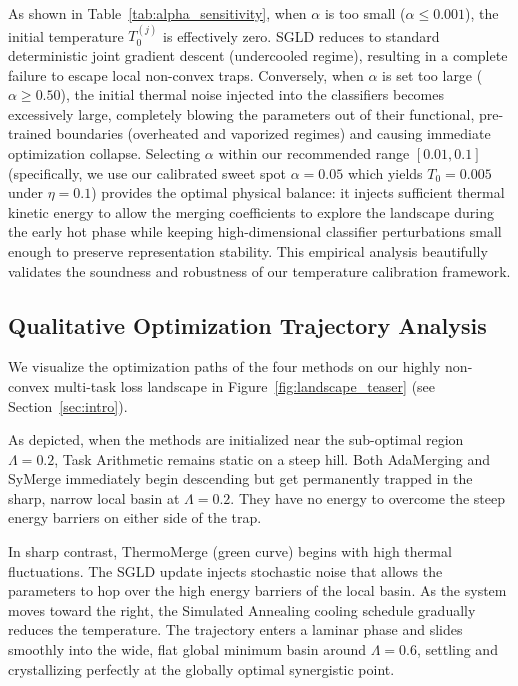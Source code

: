 As shown in Table~\ref{tab:alpha_sensitivity}, when $\alpha$ is too small ($\alpha \le 0.001$), the initial temperature $T_0^{(j)}$ is effectively zero.
SGLD reduces to standard deterministic joint gradient descent (undercooled regime), resulting in a complete failure to escape local non-convex traps.
Conversely, when $\alpha$ is set too large ($\alpha \ge 0.50$), the initial thermal noise injected into the classifiers becomes excessively large, completely blowing the parameters out of their functional, pre-trained boundaries (overheated and vaporized regimes) and causing immediate optimization collapse.
Selecting $\alpha$ within our recommended range $[0.01, 0.1]$ (specifically, we use our calibrated sweet spot $\alpha = 0.05$ which yields $T_0 = 0.005$ under $\eta = 0.1$) provides the optimal physical balance: it injects sufficient thermal kinetic energy to allow the merging coefficients to explore the landscape during the early hot phase while keeping high-dimensional classifier perturbations small enough to preserve representation stability.
This empirical analysis beautifully validates the soundness and robustness of our temperature calibration framework.

\subsection{Qualitative Optimization Trajectory Analysis}
We visualize the optimization paths of the four methods on our highly non-convex multi-task loss landscape in Figure~\ref{fig:landscape_teaser} (see Section~\ref{sec:intro}).

As depicted, when the methods are initialized near the sub-optimal region $\Lambda = 0.2$, Task Arithmetic remains static on a steep hill.
Both AdaMerging and SyMerge immediately begin descending but get permanently trapped in the sharp, narrow local basin at $\Lambda = 0.2$.
They have no energy to overcome the steep energy barriers on either side of the trap.

In sharp contrast, ThermoMerge (green curve) begins with high thermal fluctuations.
The SGLD update injects stochastic noise that allows the parameters to hop over the high energy barriers of the local basin.
As the system moves toward the right, the Simulated Annealing cooling schedule gradually reduces the temperature.
The trajectory enters a laminar phase and slides smoothly into the wide, flat global minimum basin around $\Lambda = 0.6$, settling and crystallizing perfectly at the globally optimal synergistic point.

